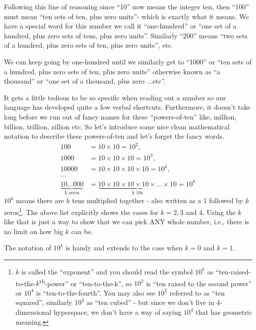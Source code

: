 \documentclass{article}
\begin{document}
Following this line of reasoning since ``10'' now means the integer ten,
then ``100'' must mean ``ten sets of ten,
plus zero units''- which is exactly what it means.
We have a special word for this number we call it ``one-hundred'' or ``one set of a hundred,
plus zero sets of tens, plus zero units''.
Similarly ``200'' means ``two sets of a hundred, plus zero sets of ten,
plus zero units'', etc.

We can keep going by one-hundred until we similarly get to ``1000'' or ``ten sets of a hundred,
plus zero sets of ten, plus zero units'' otherwise known
as ``a thousand'' or ``one set of a thousand, plus zero ...etc''.

It gets a little tedious to be so specific when reading out
a number so our language has developed quite a few verbal shortcuts.
Furthermore, it doesn't take long before we run out of fancy names
for these ``powers-of-ten'' like, million, billion, trillion,
zillion etc. So let's introduce some nice clean mathematical notation
to describe these powers-of-ten and let's forget the fancy words.
\begin{align*}
100&=10\times10=10^2,\\
1000&= 10\times10\times10=10^3,\\
10000&= 10\times10\times10\times10=10^4,\\
\dots{}\\
\underbrace{10\dots{}000}_\text{k zeros}&=
\underbrace{10\times10\times10\times10\times\dots{}\times10}_\text{k 10s}=10^k
\end{align*}
$10^k$ means there are $k$ tens multiplied together - 
also written as a 1 followed by $k$ zeros\footnote{$k$ is called the ``exponent'' and you should
read the symbol $10^k$ as ``ten-raised-to-the-$k$\textsuperscript{th}-power'' or ``ten-to-the-k'',
so $10^2$ is ``ten raised to the second power'' or $10^4$ is ``ten-to-the-fourth''.
You may also see $10^2$ referred to as ``ten squared'',
similarly $10^3$ as ``ten cubed'' - but since we 
don't live in 4-dimensional hyperspace,
we don't have a way of saying $10^4$ that has geometric meaning.}.
The above list explicitly shows the cases for $k = 2, 3$ and $4$.
Using the $k$ like that is just a way to show that we can pick ANY whole number,
i.e., there is no limit on how big $k$ can be.

The notation of $10^k$ is handy and extends
to the case when $k=0$ and $k=1$.
\end{document}
